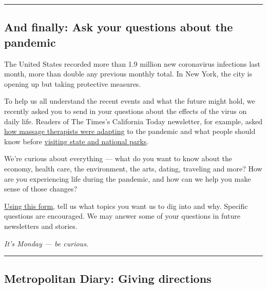 \begin{center}\rule{0.5\linewidth}{\linethickness}\end{center}

\hypertarget{and-finally-ask-your-questions-about-the-pandemic}{%
\subsection{And finally: Ask your questions about the
pandemic}\label{and-finally-ask-your-questions-about-the-pandemic}}

The United States recorded more than 1.9 million new coronavirus
infections last month, more than double any previous monthly total. In
New York, the city is opening up but taking protective measures.

To help us all understand the recent events and what the future might
hold, we recently asked you to send in your questions about the effects
of the virus on daily life. Readers of The Times's California Today
newsletter, for example, asked
\href{https://www.nytimes3xbfgragh.onion/2020/07/31/us/essential-workers-massage-therapists.html}{how
massage therapists were adapting} to the pandemic and what people should
know before
\href{https://www.nytimes3xbfgragh.onion/2020/07/13/us/california-parks-coronavirus.html}{visiting
state and national parks}.

We're curious about everything --- what do you want to know about the
economy, health care, the environment, the arts, dating, traveling and
more? How are you experiencing life during the pandemic, and how can we
help you make sense of those changes?

\href{https://www.nytimes3xbfgragh.onion/2019/09/17/reader-center/coronavirus-nyc-questions.html}{Using
this form}, tell us what topics you want us to dig into and why.
Specific questions are encouraged. We may answer some of your questions
in future newsletters and stories.

\emph{It's Monday --- be curious.}

\begin{center}\rule{0.5\linewidth}{\linethickness}\end{center}

\hypertarget{metropolitan-diary-giving-directions}{%
\subsection{Metropolitan Diary: Giving
directions}\label{metropolitan-diary-giving-directions}}

